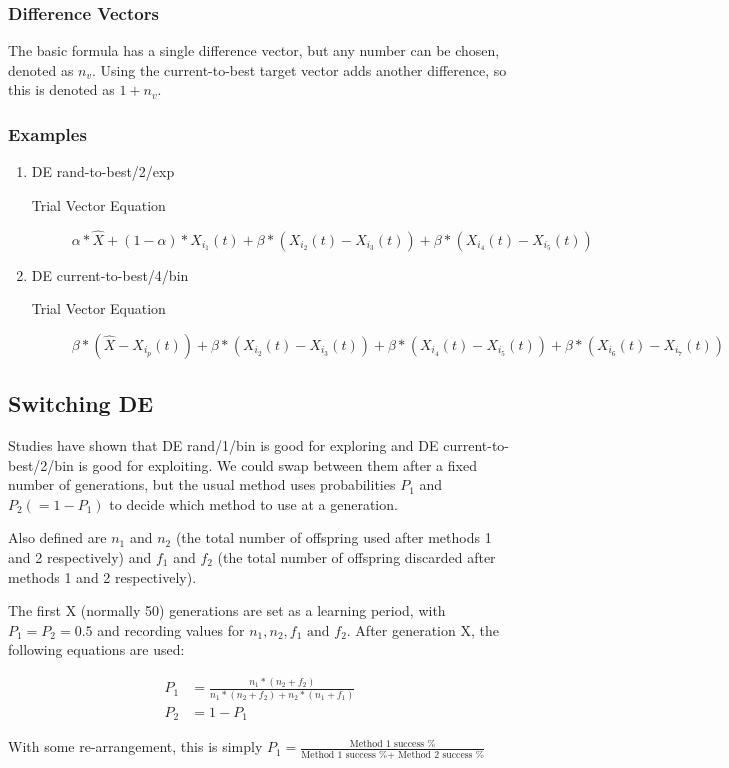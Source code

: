 \subsubsection{Difference Vectors}
The basic formula has a single difference vector, but any number can be chosen, denoted as $n_v$. Using the current-to-best target vector adds another difference, so this is denoted as $1+n_v$.

\subsubsection{Examples}
\begin{enumerate}
    \item DE rand-to-best/2/exp
    \begin{description}
    \item [Trial Vector Equation] \(\alpha*\hat{X} + (1-\alpha) * X_{i_1}(t) + \beta * (X_{i_2}(t) - X_{i_3}(t)) + \beta * (X_{i_4}(t) - X_{i_5}(t)) \)
    \end{description}
    
    \item DE current-to-best/4/bin
    \begin{description}
    \item [Trial Vector Equation] \(\beta * (\hat{X} - X_{i_p}(t)) + \beta * (X_{i_2}(t) - X_{i_3}(t)) + \beta * (X_{i_4}(t) - X_{i_5}(t)) + \beta * (X_{i_6}(t) - X_{i_7}(t)) \)
    \end{description}
\end{enumerate}

\subsection{Switching DE}
Studies have shown that DE rand/1/bin is good for exploring and DE current-to-best/2/bin is good for exploiting. We could swap between them after a fixed number of generations, but the usual method uses probabilities $P_1$ and $P_2 (= 1-P_1)$ to decide which method to use at a generation.

Also defined are $n_1$ and $n_2$ (the total number of offspring used after methods 1 and 2 respectively) and $f_1$ and $f_2$ (the total number of offspring discarded after methods 1 and 2 respectively). 

The first X (normally 50) generations are set as a learning period, with $P_1 = P_2 = 0.5$ and recording values for $n_1, n_2,f_1\text{ and }f_2$. After generation X, the following equations are used:

\begin{align}
    P_1 &= \frac{n_1 * (n_2+f_2)}{n_1 * (n_2+f_2) + n_2 * (n_1+f_1)} \\
    P_2 &= 1-P_1 \nonumber
\end{align}

With some re-arrangement, this is simply \(P_1 = \frac{\text{Method 1 success \%}}{\text{Method 1 success \% + Method 2 success \%}}\)




